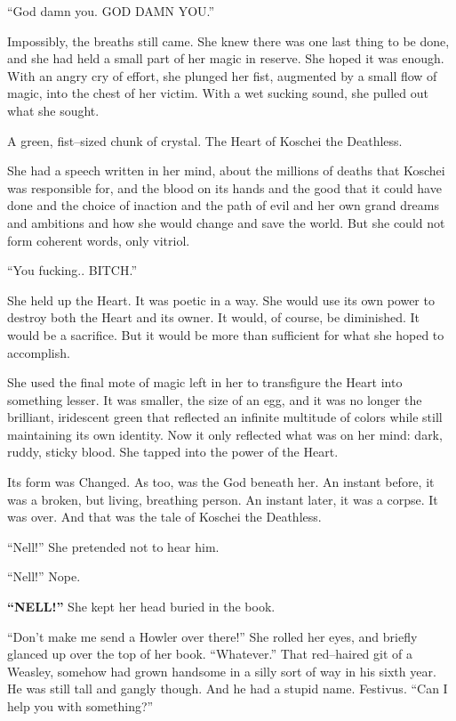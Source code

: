 “God damn you. GOD DAMN YOU.”

Impossibly, the breaths still came. She knew there was one last thing to be done, and she had held a small part of her magic in reserve. She hoped it was enough. With an angry cry of effort, she plunged her fist, augmented by a small flow of magic, into the chest of her victim. With a wet sucking sound, she pulled out what she sought.

A green, fist\mbox{--}sized chunk of crystal. The Heart of Koschei the Deathless.

She had a speech written in her mind, about the millions of deaths that Koschei was responsible for, and the blood on its hands and the good that it could have done and the choice of inaction and the path of evil and her own grand dreams and ambitions and how she would change and save the world. But she could not form coherent words, only vitriol.

“You{\el} fucking.. BITCH.”

She held up the Heart. It was poetic in a way. She would use its own power to destroy both the Heart and its owner. It would, of course, be diminished. It would be a sacrifice. But it would be more than sufficient for what she hoped to accomplish.

She used the final mote of magic left in her to transfigure the Heart into something lesser. It was smaller, the size of an egg, and it was no longer the brilliant, iridescent green that reflected an infinite multitude of colors while still maintaining its own identity. Now it only reflected what was on her mind: dark, ruddy, sticky blood. She tapped into the power of the Heart.

Its form was Changed. As too, was the God beneath her. An instant before, it was a broken, but living, breathing person. An instant later, it was a corpse. It was over.
\SomeVSpace
And that was the tale of Koschei the Deathless.
\simpleline

“Nell!” She pretended not to hear him.

“Nell!” Nope.

\textbf{“NELL!”} She kept her head buried in the book.

“Don’t make me send a Howler over there!” She rolled her eyes, and briefly glanced up over the top of her book. “Whatever.” That red\mbox{--}haired git of a Weasley, somehow had grown handsome in a silly sort of way in his sixth year. He was still tall and gangly though. And he had a stupid name. Festivus. “Can I help you with something?”

